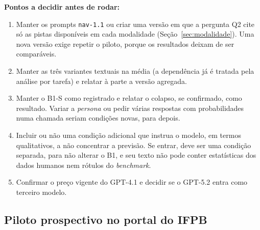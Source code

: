 \documentclass[12pt,oneside,a4paper,chapter=TITLE,english,brazil]{abntex2}
\newcommand{\code}[1]{\texttt{#1}}
\begin{document}
\begin{planejado}
\textbf{Pontos a decidir antes de rodar:}
\begin{enumerate}
\item Manter os prompts \code{nav-1.1} ou criar uma versão em que a pergunta Q2 cite só as pistas disponíveis em cada modalidade (Seção~\ref{sec:modalidade}). Uma nova versão exige repetir o piloto, porque os resultados deixam de ser comparáveis.
\item Manter as três variantes textuais na média (a dependência já é tratada pela análise por tarefa) e relatar à parte a versão agregada.
\item Manter o B1-S como registrado e relatar o colapso, se confirmado, como resultado. Variar a \textit{persona} ou pedir várias respostas com probabilidades numa chamada \cite{zhang2025verbalizedsampling} seriam condições novas, para depois.
\item Incluir ou não uma condição adicional que instrua o modelo, em termos qualitativos, a não concentrar a previsão. Se entrar, deve ser uma condição separada, para não alterar o B1, e seu texto não pode conter estatísticas dos dados humanos nem rótulos do \textit{benchmark}.
\item Confirmar o preço vigente do GPT-4.1 e decidir se o GPT-5.2 entra como terceiro modelo.
\end{enumerate}
\end{planejado}

\subsection{Piloto prospectivo no portal do IFPB}
\label{sec:ifpb}
\end{document}
